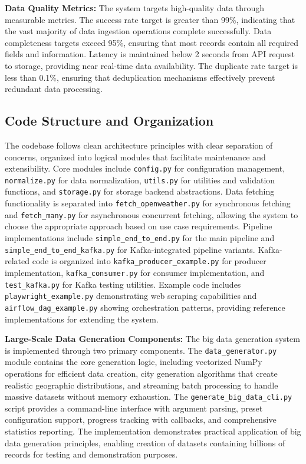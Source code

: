 \documentclass[12pt,a4paper]{article}
\begin{document}
\textbf{Data Quality Metrics:} The system targets high-quality data through measurable metrics. The success rate target is greater than 99\%, indicating that the vast majority of data ingestion operations complete successfully. Data completeness targets exceed 95\%, ensuring that most records contain all required fields and information. Latency is maintained below 2 seconds from API request to storage, providing near real-time data availability. The duplicate rate target is less than 0.1\%, ensuring that deduplication mechanisms effectively prevent redundant data processing.

\subsection{Code Structure and Organization}

The codebase follows clean architecture principles with clear separation of concerns, organized into logical modules that facilitate maintenance and extensibility. Core modules include \texttt{config.py} for configuration management, \texttt{normalize.py} for data normalization, \texttt{utils.py} for utilities and validation functions, and \texttt{storage.py} for storage backend abstractions. Data fetching functionality is separated into \texttt{fetch\_openweather.py} for synchronous fetching and \texttt{fetch\_many.py} for asynchronous concurrent fetching, allowing the system to choose the appropriate approach based on use case requirements. Pipeline implementations include \texttt{simple\_end\_to\_end.py} for the main pipeline and \texttt{simple\_end\_to\_end\_kafka.py} for Kafka-integrated pipeline variants. Kafka-related code is organized into \texttt{kafka\_producer\_example.py} for producer implementation, \texttt{kafka\_consumer.py} for consumer implementation, and \texttt{test\_kafka.py} for Kafka testing utilities. Example code includes \texttt{playwright\_example.py} demonstrating web scraping capabilities and \texttt{airflow\_dag\_example.py} showing orchestration patterns, providing reference implementations for extending the system.

\textbf{Large-Scale Data Generation Components:} The big data generation system is implemented through two primary components. The \texttt{data\_generator.py} module contains the core generation logic, including vectorized NumPy operations for efficient data creation, city generation algorithms that create realistic geographic distributions, and streaming batch processing to handle massive datasets without memory exhaustion. The \texttt{generate\_big\_data\_cli.py} script provides a command-line interface with argument parsing, preset configuration support, progress tracking with callbacks, and comprehensive statistics reporting. The implementation demonstrates practical application of big data generation principles, enabling creation of datasets containing billions of records for testing and demonstration purposes.
\end{document}
